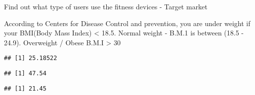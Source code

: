 \documentclass[
]{article}
\newenvironment{Shaded}{\begin{snugshade}}{\end{snugshade}}
\newcommand{\AttributeTok}[1]{\textcolor[rgb]{0.77,0.63,0.00}{#1}}
\newcommand{\CommentTok}[1]{\textcolor[rgb]{0.56,0.35,0.01}{\textit{#1}}}
\newcommand{\DecValTok}[1]{\textcolor[rgb]{0.00,0.00,0.81}{#1}}
\newcommand{\FloatTok}[1]{\textcolor[rgb]{0.00,0.00,0.81}{#1}}
\newcommand{\FunctionTok}[1]{\textcolor[rgb]{0.00,0.00,0.00}{#1}}
\newcommand{\NormalTok}[1]{#1}
\newcommand{\OtherTok}[1]{\textcolor[rgb]{0.56,0.35,0.01}{#1}}
\newcommand{\SpecialCharTok}[1]{\textcolor[rgb]{0.00,0.00,0.00}{#1}}
\newcommand{\StringTok}[1]{\textcolor[rgb]{0.31,0.60,0.02}{#1}}
\begin{document}
Find out what type of users use the fitness devices - Target market

According to Centers for Disease Control and prevention, you are under
weight if your BMI(Body Mass Index) \textless{} 18.5. Normal weight -
B.M.1 is between (18.5 - 24.9). Overweight / Obese B.M.I \textgreater{}
30

\begin{Shaded}
\end{Shaded}

\begin{verbatim}
## [1] 25.18522
\end{verbatim}

\begin{Shaded}
\end{Shaded}

\begin{verbatim}
## [1] 47.54
\end{verbatim}

\begin{Shaded}
\end{Shaded}

\begin{verbatim}
## [1] 21.45
\end{verbatim}

\begin{Shaded}
\end{Shaded}
\end{document}
